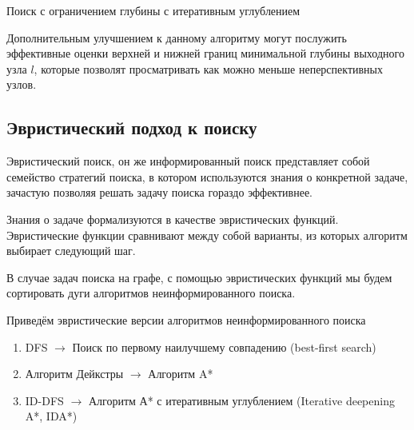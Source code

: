 \begin{algorithm}[H]
\SetAlgoLined
{}

\caption{Поиск с ограничением глубины с итеративным углублением} \label{algo:ID-DLS}
\end{algorithm}

Дополнительным улучшением к данному алгоритму могут послужить эффективные оценки верхней и нижней границ минимальной глубины выходного узла $l$, которые позволят просматривать как можно меньше неперспективных узлов.

\subsection{Эвристический подход к поиску} \label{sec:heuristics-intro}

Эвристический поиск, он же информированный поиск представляет собой семейство стратегий поиска,
в котором используются знания о конкретной задаче, зачастую позволяя решать задачу поиска гораздо эффективнее.

Знания о задаче формализуются в качестве эвристических функций.
Эвристические функции сравнивают между собой варианты, из которых алгоритм выбирает следующий шаг.

В случае задач поиска на графе, с помощью эвристических функций мы будем сортировать дуги алгоритмов неинформированного поиска.

Приведём эвристические версии алгоритмов неинформированного поиска
\begin{enumerate}
    \item DFS $\rightarrow$ Поиск по первому наилучшему совпадению (best-first search)
    \item Алгоритм Дейкстры $\rightarrow$ Алгоритм A*
    \item ID-DFS $\rightarrow$ Алгоритм А* с итеративным углублением (Iterative deepening A*, IDA*)
\end{enumerate}


